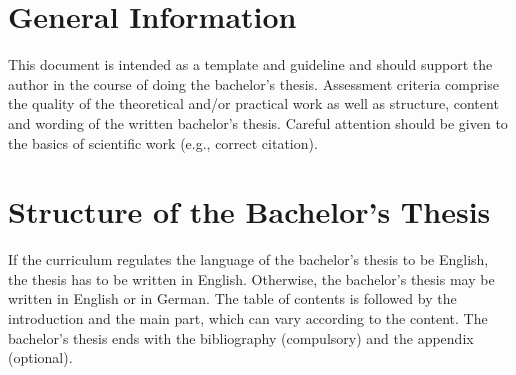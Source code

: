 \section{General Information}

This document is intended as a template and guideline and should support the author in the course of doing the bachelor's thesis.
Assessment criteria comprise the quality of the theoretical and/or practical work as well as structure, content and wording of the written bachelor's thesis. Careful attention should be given to the basics of scientific work (e.g., correct citation).

\section{Structure of the Bachelor's Thesis}

If the curriculum regulates the language of the bachelor's thesis to be English, the thesis has to be written in English. Otherwise, the bachelor's thesis may be written in English or in German.
The table of contents is followed by the introduction and the main part, which can vary according to the content. The bachelor's thesis ends with the bibliography (compulsory) and the appendix (optional).


